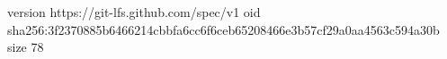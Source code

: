 version https://git-lfs.github.com/spec/v1
oid sha256:3f2370885b6466214cbbfa6cc6f6ceb65208466e3b57cf29a0aa4563c594a30b
size 78
